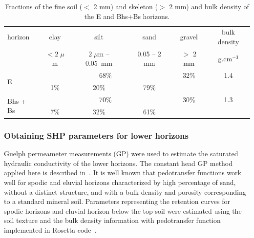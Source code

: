 \documentclass[review,times,3p,twocolumn,10pt]{elsarticle}
\newcommand{\fs}{\footnotesize}
\begin{document}
%

 \begin{table}[ht]
 \fs
 	\begin{center}
 		\caption{Fractions of the fine soil ($<$ 2 mm) and skeleton ($>$ 2 mm) and bulk density of the E and Bhs+Bs horizons.}
 		\begin{small}
 			\begin{tabular}{l c  c  c  c  c}
 				\toprule
 				horizon & clay & silt & sand  & gravel & bulk density  \\ 
 				&  $<2\;\mu$m & $2\;\mu$m -- 0.05~mm & 0.05 -- 2 mm & $>$ 2 mm & g.cm$^{-3}$ \\ \hline
 				\multirow{2}{*}{E}      & \multicolumn{3}{c}{68\%}               & \multirow{1}{*}{32\%}  &\multirow{1}{*}{1.4}   \\ 
 				\cmidrule{2-4}
 				&  1\%               & 20\%                        & 79\%      & &\\
 				
 				\multirow{2}{*}{Bhs + Bs }      & \multicolumn{3}{c}{70\%}               & \multirow{1}{*}{30\%}  &\multirow{1}{*}{1.3}   \\ 
 				\cmidrule{2-4}
 				&7\%           & 32\%                       & 61\%          & &\\
 				
 				\toprule
 			\end{tabular}
 		\end{small}
 		\label{tab:soiltxt}
 	\end{center}
 \end{table}







\subsubsection{Obtaining SHP parameters for lower horizons}
\label{shp}

Guelph permeameter measurements (GP) were used to estimate the saturated hydraulic conductivity of the lower horizons. The constant head GP method applied here is described in~\citep{Jacka1}.
It is well known that pedotransfer functions work well for spodic and eluvial horizons characterized by high percentage of sand, without a distinct structure, and with a bulk density and porosity corresponding to a standard mineral soil. Parameters representing the retention curves for spodic horizons and eluvial horizon below the top-soil were estimated using the soil texture and the bulk density information with pedotransfer function implemented in Rosetta code~\citep{Schaap}.
\end{document}
